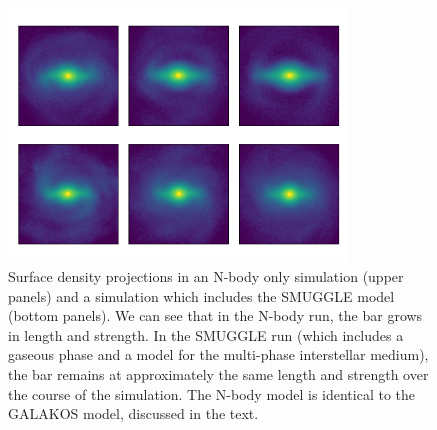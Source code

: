 \documentclass{natureprintstyle}
\begin{document}
\begin{figure}[h]%
\centering
\includegraphics[width=0.8\textwidth]{fig/fig1.pdf}
\caption{Surface density projections in an N-body only simulation (upper
panels) and a simulation which includes the SMUGGLE model (bottom panels). We
can see that in the N-body run, the bar grows in length and strength. In the
SMUGGLE run (which includes a gaseous phase and a model for the multi-phase
interstellar medium), the bar remains at approximately the same length and
strength over the course of the simulation. The N-body model is identical to
the GALAKOS model, discussed in the text.}\label{fig:overview}
\end{figure}
\end{document}

